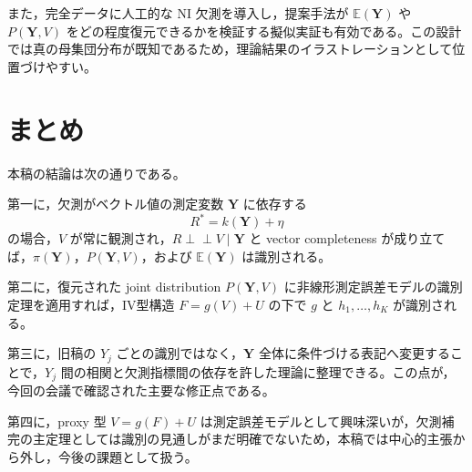 \documentclass[dvipdfmx,autodetect-engine]{jsarticle}
\newcommand{\indep}{\mathrel{\perp\!\!\!\perp}}
\newcommand{\E}{\mathbb{E}}
\newcommand{\1}{\mathbf{1}}
\newcommand{\Y}{\bm{Y}}
\begin{document}
また，完全データに人工的な NI 欠測を導入し，提案手法が $\E(\Y)$ や $P(\Y,V)$ をどの程度復元できるかを検証する擬似実証も有効である。この設計では真の母集団分布が既知であるため，理論結果のイラストレーションとして位置づけやすい。

\section{まとめ}

本稿の結論は次の通りである。

第一に，欠測がベクトル値の測定変数 $\Y$ に依存する
\begin{equation}
  R^*=k(\Y)+\eta
\end{equation}
の場合，$V$ が常に観測され，$R\indep V\mid \Y$ と vector completeness が成り立てば，$\pi(\Y)$，$P(\Y,V)$，および $\E(\Y)$ は識別される。

第二に，復元された joint distribution $P(\Y,V)$ に非線形測定誤差モデルの識別定理を適用すれば，IV型構造 $F=g(V)+U$ の下で $g$ と $h_1,\ldots,h_K$ が識別される。

第三に，旧稿の $Y_j$ ごとの識別ではなく，$\Y$ 全体に条件づける表記へ変更することで，$Y_j$ 間の相関と欠測指標間の依存を許した理論に整理できる。この点が，今回の会議で確認された主要な修正点である。

第四に，proxy 型 $V=g(F)+U$ は測定誤差モデルとして興味深いが，欠測補完の主定理としては識別の見通しがまだ明確でないため，本稿では中心的主張から外し，今後の課題として扱う。
\end{document}
